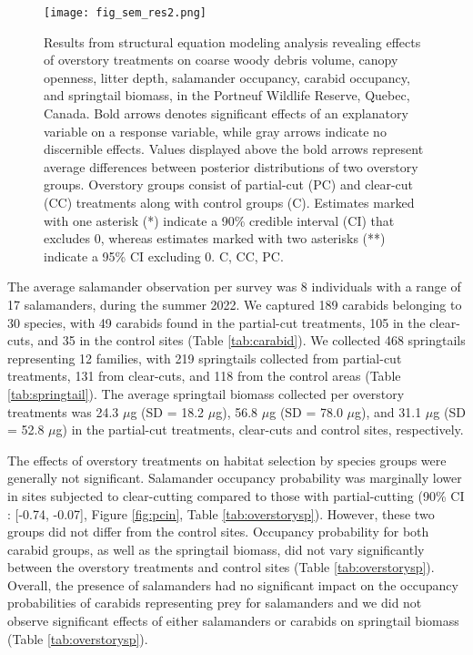 \begin{figure}[ht]
	\centering
	\texttt{[image: fig\_sem\_res2.png]}
	\caption[Results from structural equation modeling analysis revealing effects of overstory treatments on coarse woody debris volume,
  canopy openness, litter depth, salamander occupancy, carabid occupancy, and springtail biomass.]
  {Results from structural equation modeling analysis revealing effects of overstory treatments on coarse woody debris volume,
  canopy openness, litter depth, salamander occupancy, carabid occupancy, and springtail biomass, in the Portneuf Wildlife Reserve, 
  Quebec, Canada. Bold arrows denotes significant effects of an explanatory variable on a response variable, 
  while gray arrows indicate no discernible effects. Values displayed above the bold arrows represent average differences between posterior distributions of two overstory groups. 
  Overstory groups consist of partial-cut (PC) and clear-cut (CC) treatments along with control groups (C).
  Estimates marked with one asterisk (*) indicate a 90\% credible interval (CI) that excludes 0, 
  whereas estimates marked with two asterisks (**) indicate a 95\% CI excluding 0. C, CC, PC. }
	\label{fig:SEMres}
\end{figure}  




\vspace{10pt}

The average salamander observation per survey was 8 individuals with a range of 17 salamanders, during the summer 2022.
We captured 189 carabids belonging to 30 species, with 49 carabids found in the partial-cut treatments, 105 in the clear-cuts, and 35 in the control sites (Table \ref{tab:carabid}). 
We collected 468 springtails representing 12 families, with 219 springtails collected from partial-cut treatments, 131 from clear-cuts, and 118 from the control areas (Table \ref{tab:springtail}). 
The average springtail biomass collected per overstory treatments was 24.3 $\mu$g (SD = 18.2 $\mu$g), 56.8 $\mu$g (SD = 78.0 $\mu$g), and 31.1 $\mu$g (SD = 52.8 $\mu$g) in the partial-cut treatments, clear-cuts and control sites, respectively.

The effects of overstory treatments on habitat selection by species groups were generally not significant. 
Salamander occupancy probability was marginally lower in sites subjected to clear-cutting compared to those with partial-cutting (90\% CI : [-0.74, -0.07], Figure \ref{fig:pcin}, Table \ref{tab:overstorysp}). 
However, these two groups did not differ from the control sites. 
Occupancy probability for both carabid groups, as well as the springtail biomass, did not vary significantly between the overstory treatments and control sites (Table \ref{tab:overstorysp}). 
Overall, the presence of salamanders had no significant impact on the occupancy probabilities of carabids representing prey for salamanders and we did not observe significant effects of either salamanders or carabids on springtail biomass (Table \ref{tab:overstorysp}).

